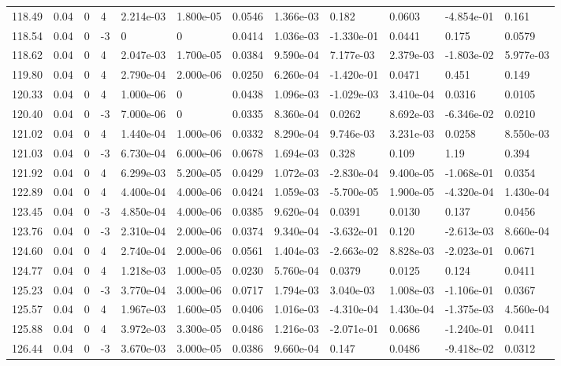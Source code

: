 \documentclass[preview]{standalone}
\begin{document}
{{{{{{{\begin{tabular}{L{1.2cm}C{1.2cm} C{0.3cm}C{0.5cm} C{1.4cm}C{1.4cm} C{1.4cm}C{1.4cm} C{1.6cm}C{1.6cm} C{1.6cm}C{1.6cm}}
  118.49  &  0.04  & 0     &  4 &  2.214e-03  & 1.800e-05  &  0.0546&   1.366e-03& 0.182 & 0.0603   &  -4.854e-01 & 0.161  \\ 
  118.54  &  0.04  & 0     & -3 &  0  & 0  &  0.0414&   1.036e-03& -1.330e-01 & 0.0441   &  0.175 & 0.0579  \\ 
  118.62  &  0.04  & 0     &  4 &  2.047e-03  & 1.700e-05  &  0.0384&   9.590e-04& 7.177e-03 & 2.379e-03   &  -1.803e-02 & 5.977e-03  \\ 
  119.80  &  0.04  & 0     &  4 &  2.790e-04  & 2.000e-06  &  0.0250&   6.260e-04& -1.420e-01 & 0.0471   &  0.451 & 0.149  \\ 
  120.33  &  0.04  & 0     &  4 &  1.000e-06  & 0  &  0.0438&   1.096e-03& -1.029e-03 & 3.410e-04   &  0.0316 & 0.0105  \\ 
  120.40  &  0.04  & 0     & -3 &  7.000e-06  & 0  &  0.0335&   8.360e-04& 0.0262 & 8.692e-03   &  -6.346e-02 & 0.0210  \\ 
  121.02  &  0.04  & 0     &  4 &  1.440e-04  & 1.000e-06  &  0.0332&   8.290e-04& 9.746e-03 & 3.231e-03   &  0.0258 & 8.550e-03  \\ 
  121.03  &  0.04  & 0     & -3 &  6.730e-04  & 6.000e-06  &  0.0678&   1.694e-03& 0.328 & 0.109   &  1.19 & 0.394  \\ 
  121.92  &  0.04  & 0     &  4 &  6.299e-03  & 5.200e-05  &  0.0429&   1.072e-03& -2.830e-04 & 9.400e-05   &  -1.068e-01 & 0.0354  \\ 
  122.89  &  0.04  & 0     &  4 &  4.400e-04  & 4.000e-06  &  0.0424&   1.059e-03& -5.700e-05 & 1.900e-05   &  -4.320e-04 & 1.430e-04  \\ 
  123.45  &  0.04  & 0     & -3 &  4.850e-04  & 4.000e-06  &  0.0385&   9.620e-04& 0.0391 & 0.0130   &  0.137 & 0.0456  \\ 
  123.76  &  0.04  & 0     & -3 &  2.310e-04  & 2.000e-06  &  0.0374&   9.340e-04& -3.632e-01 & 0.120   &  -2.613e-03 & 8.660e-04  \\ 
  124.60  &  0.04  & 0     &  4 &  2.740e-04  & 2.000e-06  &  0.0561&   1.404e-03& -2.663e-02 & 8.828e-03   &  -2.023e-01 & 0.0671  \\ 
  124.77  &  0.04  & 0     &  4 &  1.218e-03  & 1.000e-05  &  0.0230&   5.760e-04& 0.0379 & 0.0125   &  0.124 & 0.0411  \\ 
  125.23  &  0.04  & 0     & -3 &  3.770e-04  & 3.000e-06  &  0.0717&   1.794e-03& 3.040e-03 & 1.008e-03   &  -1.106e-01 & 0.0367  \\ 
  125.57  &  0.04  & 0     &  4 &  1.967e-03  & 1.600e-05  &  0.0406&   1.016e-03& -4.310e-04 & 1.430e-04   &  -1.375e-03 & 4.560e-04  \\ 
  125.88  &  0.04  & 0     &  4 &  3.972e-03  & 3.300e-05  &  0.0486&   1.216e-03& -2.071e-01 & 0.0686   &  -1.240e-01 & 0.0411  \\ 
  126.44  &  0.04  & 0     & -3 &  3.670e-03  & 3.000e-05  &  0.0386&   9.660e-04& 0.147 & 0.0486   &  -9.418e-02 & 0.0312  \\ 
\hline 
\end{tabular} 

}}}}}}}
\end{document}
